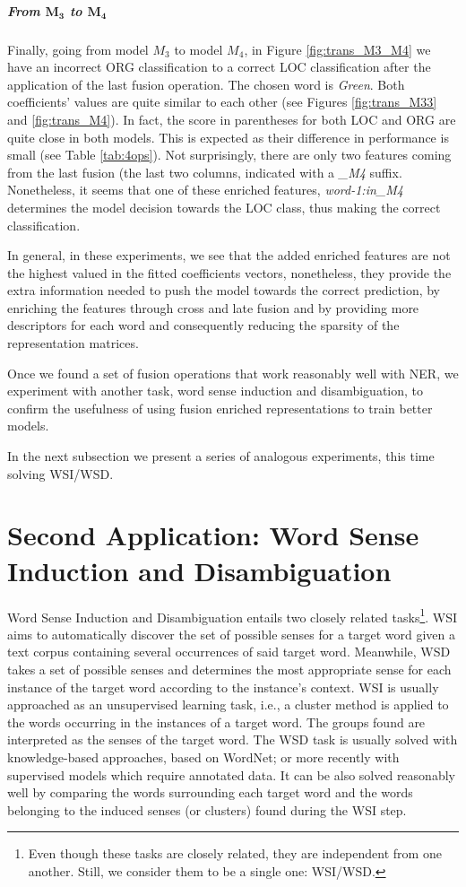 \subparagraph{From $\mathbf{M_3}$ to $\mathbf{M_4}$} Finally, going from model $M_3 $ to model $M_4$, in Figure \ref{fig:trans_M3_M4} we have an incorrect ORG classification to a correct LOC classification after the application of the last fusion operation. The chosen word is \textit{Green}. Both coefficients' values are quite similar  to each other (see Figures \ref{fig:trans_M33} and \ref{fig:trans_M4}). In fact, the score in parentheses for both LOC and ORG are quite close in both models. This is expected as their difference in performance is small (see Table \ref{tab:4ops}). Not surprisingly, there are only two features coming from the last fusion (the last two columns, indicated with a \textit{\_M4} suffix. Nonetheless, it seems that one of these enriched features, \textit{word-1:in\_M4} determines the model decision towards the LOC class, thus making the correct classification.

In general, in these experiments, we see that the added enriched features are not the highest valued in the fitted coefficients vectors, nonetheless, they  provide the extra information needed to push the model towards the correct prediction, by enriching the features through cross and late fusion and by providing more descriptors for each word and consequently reducing the sparsity of the representation matrices.

Once we found a set of fusion operations that work reasonably well with NER, we experiment with another task, word sense induction and disambiguation, to confirm the usefulness of using fusion enriched representations to train better models.

In the next subsection we present a series of analogous experiments, this time solving WSI/WSD.


\section{Second Application: Word Sense Induction and Disambiguation}
\label{sec:wsd_wsi}
Word Sense Induction and Disambiguation entails two closely related tasks\footnote{Even though these tasks are closely related, they are independent from one another. Still,  we consider them to be a single one: WSI/WSD.}. WSI aims to automatically discover the set of possible senses for a target word given a text corpus containing several occurrences of said target word. Meanwhile, WSD takes a set of possible senses and determines the most appropriate sense for each instance of the target word according to the instance's context. WSI is usually approached as an unsupervised learning task, i.e., a cluster method is applied to the words occurring in the instances of a target word. The groups found are interpreted as the senses of the target word. The WSD task is usually solved with knowledge-based approaches, based on WordNet; or more recently with supervised models which require annotated data. It can be also solved reasonably well by comparing the words surrounding each target word and the words belonging to the induced senses (or clusters) found during the WSI step.

